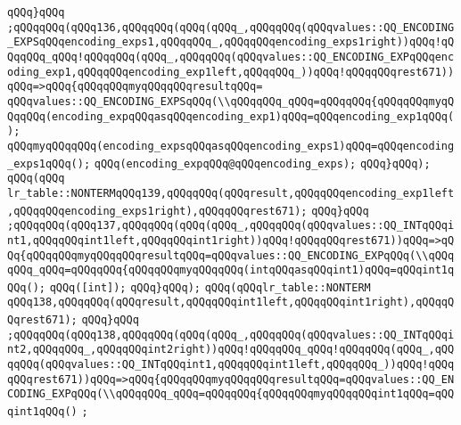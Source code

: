 \verb|qQQq}qQQq|\newline
\verb|;qQQqqQQq(qQQq136,qQQqqQQq(qQQq(qQQq_,qQQqqQQq(qQQqvalues::QQ_ENCODING_EXPSqQQqencoding_exps1,qQQqqQQq_,qQQqqQQqencoding_exps1right))qQQq!qQQqqQQq_qQQq!qQQqqQQq(qQQq_,qQQqqQQq(qQQqvalues::QQ_ENCODING_EXPqQQqencoding_exp1,qQQqqQQqencoding_exp1left,qQQqqQQq_))qQQq!qQQqqQQqrest671))qQQq=>qQQq{qQQqqQQqmyqQQqqQQqresultqQQq=|\newline
\verb|qQQqvalues::QQ_ENCODING_EXPSqQQq(\\qQQqqQQq_qQQq=qQQqqQQq{qQQqqQQqmyqQQqqQQq(encoding_expqQQqasqQQqencoding_exp1)qQQq=qQQqencoding_exp1qQQq();|\newline
\verb|qQQqmyqQQqqQQq(encoding_expsqQQqasqQQqencoding_exps1)qQQq=qQQqencoding_exps1qQQq();|\newline
\verb|qQQq(encoding_expqQQq@qQQqencoding_exps);|\newline
\verb|qQQq}qQQq);|\newline
\verb|qQQq(qQQq|\newline
\verb|lr_table::NONTERMqQQq139,qQQqqQQq(qQQqresult,qQQqqQQqencoding_exp1left,qQQqqQQqencoding_exps1right),qQQqqQQqrest671);|\newline
\verb|qQQq}qQQq|\newline
\verb|;qQQqqQQq(qQQq137,qQQqqQQq(qQQq(qQQq_,qQQqqQQq(qQQqvalues::QQ_INTqQQqint1,qQQqqQQqint1left,qQQqqQQqint1right))qQQq!qQQqqQQqrest671))qQQq=>qQQq{qQQqqQQqmyqQQqqQQqresultqQQq=qQQqvalues::QQ_ENCODING_EXPqQQq(\\qQQqqQQq_qQQq=qQQqqQQq{qQQqqQQqmyqQQqqQQq(intqQQqasqQQqint1)qQQq=qQQqint1qQQq();|\newline
\verb|qQQq([int]);|\newline
\verb|qQQq}qQQq);|\newline
\verb|qQQq(qQQqlr_table::NONTERM|\newline
\verb|qQQq138,qQQqqQQq(qQQqresult,qQQqqQQqint1left,qQQqqQQqint1right),qQQqqQQqrest671);|\newline
\verb|qQQq}qQQq|\newline
\verb|;qQQqqQQq(qQQq138,qQQqqQQq(qQQq(qQQq_,qQQqqQQq(qQQqvalues::QQ_INTqQQqint2,qQQqqQQq_,qQQqqQQqint2right))qQQq!qQQqqQQq_qQQq!qQQqqQQq(qQQq_,qQQqqQQq(qQQqvalues::QQ_INTqQQqint1,qQQqqQQqint1left,qQQqqQQq_))qQQq!qQQqqQQqrest671))qQQq=>qQQq{qQQqqQQqmyqQQqqQQqresultqQQq=qQQqvalues::QQ_ENCODING_EXPqQQq(\\qQQqqQQq_qQQq=qQQqqQQq{qQQqqQQqmyqQQqqQQqint1qQQq=qQQqint1qQQq()|\newline
\verb|;|\newline

